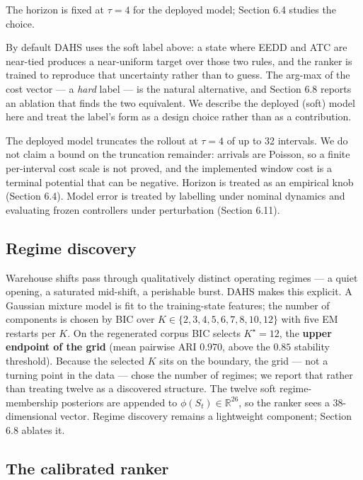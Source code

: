 \documentclass[review,3p,times]{elsarticle}
\theoremstyle{definition}
\begin{document}
The horizon is fixed at \(\tau = 4\) for the deployed model; Section 6.4
studies the choice.

By default DAHS uses the soft label above: a state where EEDD and ATC
are near-tied produces a near-uniform target over those two rules, and
the ranker is trained to reproduce that uncertainty rather than to
guess. The arg-max of the cost vector --- a \emph{hard} label --- is the
natural alternative, and Section 6.8 reports an ablation that finds the
two equivalent. We describe the deployed (soft) model here and treat the
label's form as a design choice rather than as a contribution.

The deployed model truncates the rollout at \(\tau = 4\) of up to 32
intervals. We do not claim a bound on the truncation remainder: arrivals
are Poisson, so a finite per-interval cost scale is not proved, and the
implemented window cost is a terminal potential that can be negative.
Horizon is treated as an empirical knob (Section 6.4). Model error is
treated by labelling under nominal dynamics and evaluating frozen
controllers under perturbation (Section 6.11).

\subsection{Regime discovery}\label{regime-discovery}

Warehouse shifts pass through qualitatively distinct operating regimes
--- a quiet opening, a saturated mid-shift, a perishable burst. DAHS
makes this explicit. A Gaussian mixture model is fit to the
training-state features; the number of components is chosen by BIC over
\(K \in \{2,3,4,5,6,7,8,10,12\}\) with five EM restarts per \(K\). On
the regenerated corpus BIC selects \(K^\star = 12\), the \textbf{upper
endpoint of the grid} (mean pairwise ARI \(0.970\), above the \(0.85\)
stability threshold). Because the selected \(K\) sits on the boundary,
the grid --- not a turning point in the data --- chose the number of
regimes; we report that rather than treating twelve as a discovered
structure. The twelve soft regime-membership posteriors are appended to
\(\phi(S_t) \in \mathbb{R}^{26}\), so the ranker sees a
\(38\)-dimensional vector. Regime discovery remains a lightweight
component; Section 6.8 ablates it.

\subsection{The calibrated ranker}\label{the-calibrated-ranker}
\end{document}

